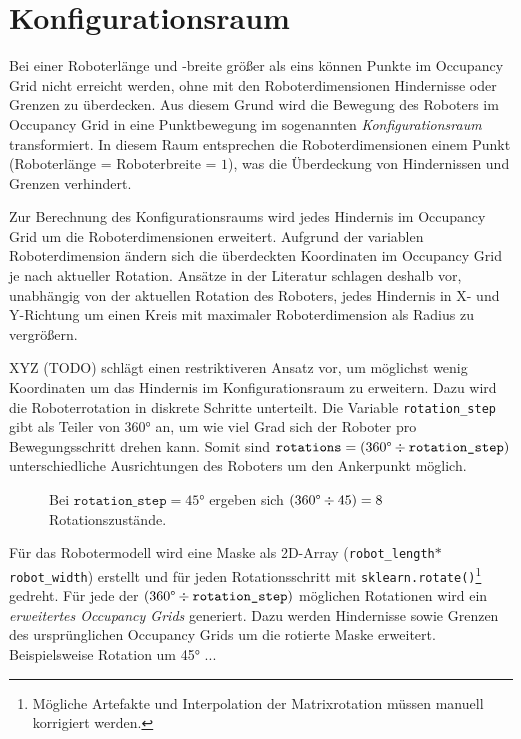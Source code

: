 \chapter{Konfigurationsraum}


Bei einer Roboterlänge und -breite größer als eins können Punkte im Occupancy Grid nicht erreicht werden, ohne mit den Roboterdimensionen Hindernisse oder Grenzen zu überdecken. 
Aus diesem Grund wird die Bewegung des Roboters im Occupancy Grid in eine Punktbewegung im sogenannten \textit{Konfigurationsraum} transformiert.
In diesem Raum entsprechen die Roboterdimensionen einem Punkt (Roboterlänge = Roboterbreite = $1$), was die Überdeckung von Hindernissen und Grenzen verhindert.

Zur Berechnung des Konfigurationsraums wird jedes Hindernis im Occupancy Grid um die Roboterdimensionen erweitert.
Aufgrund der variablen Roboterdimension ändern sich die überdeckten Koordinaten im Occupancy Grid je nach aktueller Rotation.
Ansätze in der Literatur schlagen deshalb vor, unabhängig von der aktuellen Rotation des Roboters, jedes Hindernis in X- und Y-Richtung um einen Kreis mit maximaler Roboterdimension als Radius zu vergrößern.

XYZ (TODO) schlägt einen restriktiveren Ansatz vor, um möglichst wenig Koordinaten um das Hindernis im Konfigurationsraum zu erweitern.
Dazu wird die Roboterrotation in diskrete Schritte unterteilt. Die Variable \texttt{rotation\_step} gibt als Teiler von 360° an, um wie viel Grad sich der Roboter pro Bewegungsschritt drehen kann.
Somit sind $\texttt{rotations} = (360 \text{\textdegree} \div \texttt{rotation\_step})$ unterschiedliche Ausrichtungen des Roboters um den Ankerpunkt möglich.

\begin{figure}[h!]
	\centering
	\footnotesize
	\centerline{\resizebox{0.7\linewidth}{!}{}}
	\caption{Bei $\texttt{rotation\_step}=45$° ergeben sich $(360 \text{\textdegree} \div 45) = 8$ Rotationszustände.}
\end{figure}

Für das Robotermodell wird eine Maske als 2D-Array (\texttt{robot\_length}$*$\texttt{robot\_width}) erstellt und für jeden Rotationsschritt mit \texttt{sklearn.rotate()}\footnote{Mögliche Artefakte und Interpolation der Matrixrotation müssen manuell korrigiert werden.} gedreht.
Für jede der $(360 \text{\textdegree} \div \texttt{rotation\_step})$ möglichen Rotationen wird ein \textit{erweitertes Occupancy Grids} generiert. Dazu werden Hindernisse sowie Grenzen des ursprünglichen Occupancy Grids um die rotierte Maske erweitert.
Beispielsweise Rotation um 45° ...

